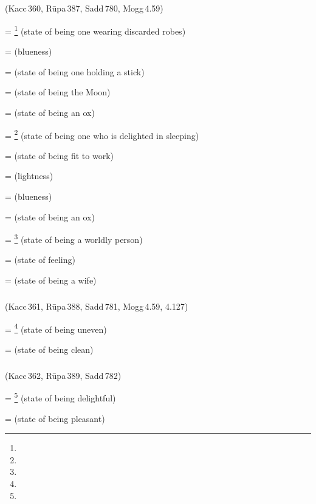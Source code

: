 \subparagraph*{} (Kacc\,360, R\=upa\,387, Sadd\,780, Mogg\,4.59)\label{pacct8:tta}\label{pacct8:taa}\label{pacct8:ttana}

 = \footnote{} (state of being one wearing discarded robes) \par
{} =  (blueness) \par
{} =  (state of being one holding a stick) \par
{} =  (state of being the Moon) \par
{} =  (state of being an ox) \par
{} = \footnote{} (state of being one who is delighted in sleeping) \par
{} =  (state of being fit to work) \par
{} =  (lightness) \par
{} =  (blueness) \par
{} =  (state of being an ox) \par
{} = \footnote{} (state of being a worldly person) \par
{} =  (state of feeling) \par
{} =  (state of being a wife) \par

\subparagraph*{} (Kacc\,361, R\=upa\,388, Sadd\,781, Mogg\,4.59, 4.127)\label{pacct8:dna}

 = \footnote{} (state of being uneven) \par
{} =  (state of being clean) \par

\subparagraph*{} (Kacc\,362, R\=upa\,389, Sadd\,782)\label{pacct8:kadn}

 = \footnote{} (state of being delightful) \par
{} =  (state of being pleasant) \par

